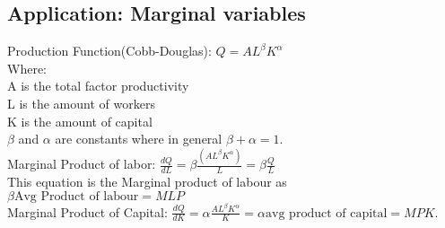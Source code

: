 \documentclass{book}
\begin{document}
    \subsection{Application: Marginal variables}
    Production Function(Cobb-Douglas):
    $Q=AL^\beta K^\alpha$\\
    Where:\\
    A is the total factor productivity\\
    L is the amount of workers\\
    K is the amount of capital\\
    $\beta$ and $\alpha$ are constants where in general $\beta + \alpha = 1$.\\
    Marginal Product of labor:
    $\frac{dQ}{dL} = \beta \frac{(AL^\beta K^\alpha)}{L} = \beta \frac{Q}{L}$\\
    This equation is the Marginal product of labour as $\beta \text{Avg Product of labour} = MLP$\\
    Marginal Product of Capital: 
    $\frac{dQ}{dK} = \alpha \frac{A L^\beta K^\alpha}{K} = \alpha \text{avg product of capital} = MPK$.
\end{document}
